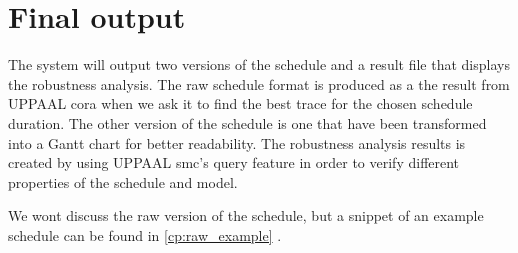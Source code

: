 \section{Final output}\label{sec:final}
The system will output two versions of the schedule and a result file that displays the robustness analysis. The raw schedule format is produced as a the result from UPPAAL \gls{cora} when we ask it to find the best trace for the chosen schedule duration. The other version of the schedule is one that have been transformed into a Gantt chart for better readability. The robustness analysis results is created by using UPPAAL \gls{smc}'s query feature in order to verify different properties of the schedule and model.

We wont discuss the raw version of the schedule, but a snippet of an example schedule can be found in \cref{cp:raw_example} .



